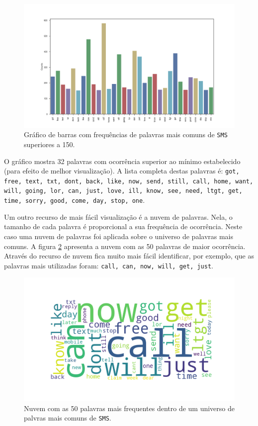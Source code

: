 \documentclass[a4paper,11pt]{article}
\begin{document}
\begin{figure}[htbp]
    \centering
    \includegraphics[width=\textwidth]{word_barplot.png}
    \caption[Figura simples]{Gráfico de barras com frequências de palavras mais comuns de 
    \texttt{SMS} superiores a 150.}
    \label{fig:barplot}
\end{figure}

O gráfico mostra 32 palavras com ocorrência superior ao mínimo estabelecido (para efeito de melhor
visualização). A lista completa destas palavras é: \texttt{got, free, text, txt, dont, back, 
like, now, send, still, call, home, want, will, going, lor, can, just, love, ill, know, see, need, 
ltgt, get, time, sorry, good, come, day, stop, one}.

Um outro recurso de mais fácil visualização é a nuvem de palavras. Nela, o tamanho de cada palavra 
é proporcional a sua frequência de ocorrência. Neste caso uma nuvem de palavras foi aplicada sobre 
o universo de palavras mais comuns. A figura \ref{fig:wordcloud} apresenta a nuvem com as 50 palavras 
de maior ocorrência. Através do recurso de nuvem fica muito mais fácil identificar, por exemplo,
que as palavras mais utilizadas foram: \texttt{call, can, now, will, get, just}.


\begin{figure}[htbp]
    \centering
    \includegraphics[width=\textwidth]{word_cloud.png}
    \caption[Figura simples]{Nuvem com as 50 palavras mais frequentes dentro de um universo de 
    palvras mais comuns de \texttt{SMS}.}
    \label{fig:wordcloud}
\end{figure}
\end{document}
